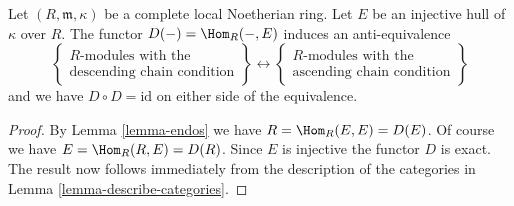 \begin{proposition}
\label{proposition-matlis}
Let $(R, \mathfrak m, \kappa)$ be a complete local Noetherian ring.
Let $E$ be an injective hull of $\kappa$ over $R$. The functor
$D(-) = \Hom_R(-, E)$ induces an anti-equivalence
$$
\left\{
\begin{matrix}
R\text{-modules with the} \\
\text{descending chain condition}
\end{matrix}
\right\}
\longleftrightarrow
\left\{
\begin{matrix}
R\text{-modules with the} \\
\text{ascending chain condition}
\end{matrix}
\right\}
$$
and we have $D \circ D = \text{id}$ on either side of the equivalence.
\end{proposition}

\begin{proof}
By Lemma \ref{lemma-endos} we have $R = \Hom_R(E, E) = D(E)$.
Of course we have $E = \Hom_R(R, E) = D(R)$. Since $E$ is injective
the functor $D$ is exact. The result now follows immediately from the
description of the categories in
Lemma \ref{lemma-describe-categories}.
\end{proof}